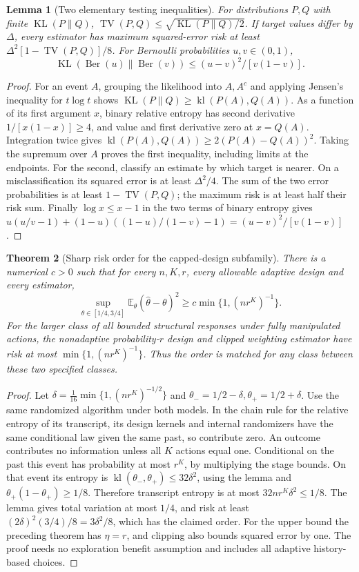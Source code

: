 \documentclass[11pt]{article}
\newtheorem{theorem}{Theorem}
\newtheorem{lemma}[theorem]{Lemma}
\theoremstyle{remark}
\newcommand{\E}{\mathbb E}
\newcommand{\TV}{\operatorname{TV}}
\newcommand{\KL}{\operatorname{KL}}
\begin{document}
\begin{lemma}[Two elementary testing inequalities]
For distributions $P,Q$ with finite $\KL(P\|Q)$,
$\TV(P,Q)\leq\sqrt{\KL(P\|Q)/2}$. If target values differ by
$\Delta$, every estimator has maximum squared-error risk at least
$\Delta^2[1-\TV(P,Q)]/8$.
For Bernoulli probabilities $u,v\in(0,1)$,
\[
 \KL(\operatorname{Ber}(u)\|\operatorname{Ber}(v))
 \leq (u-v)^2/[v(1-v)].
\]
\end{lemma}
\begin{proof}
For an event $A$, grouping the likelihood into $A,A^c$ and applying
Jensen's inequality for $t\log t$ shows
$\KL(P\|Q)\geq\operatorname{kl}(P(A),Q(A))$.
As a function of its first argument $x$, binary relative entropy has
second derivative $1/[x(1-x)]\geq4$, and value and first derivative zero
at $x=Q(A)$. Integration twice gives
$\operatorname{kl}(P(A),Q(A))\geq2(P(A)-Q(A))^2$.
Taking the supremum over $A$ proves the first inequality, including limits
at the endpoints. For the second, classify an estimate by which target
is nearer. On a misclassification its squared error is at least
$\Delta^2/4$. The sum of the two error probabilities is at least
$1-\TV(P,Q)$; the maximum risk is at least half their risk sum.
Finally $\log x\leq x-1$ in the two terms of binary entropy gives
$u(u/v-1)+(1-u)((1-u)/(1-v)-1)=(u-v)^2/[v(1-v)]$.
\end{proof}

\begin{theorem}[Sharp risk order for the capped-design subfamily]
There is a numerical $c>0$ such that for every $n,K,r$, every allowable
adaptive design and every estimator,
\[
 \sup_{\theta\in[1/4,3/4]}\E_\theta(\widehat\theta-\theta)^2
 \geq c\min\{1,(nr^K)^{-1}\}.
\]
For the larger class of all bounded structural responses under fully
manipulated actions, the nonadaptive probability-$r$ design and clipped
weighting estimator have risk at most
$\min\{1,(nr^K)^{-1}\}$. Thus the order is matched for any class between
these two specified classes.
\end{theorem}
\begin{proof}
Let $\delta=\frac1{16}\min\{1,(nr^K)^{-1/2}\}$ and
$\theta_-=1/2-\delta,\theta_+=1/2+\delta$.
Use the same randomized algorithm under both models. In the chain rule
for the relative entropy of its transcript, its design kernels and
internal randomizers have the same conditional law given the same past,
so contribute zero. An outcome contributes no information unless all
$K$ actions equal one. Conditional on the past this event has probability
at most $r^K$, by multiplying the stage bounds. On that event its entropy
is $\operatorname{kl}(\theta_-,\theta_+)\leq32\delta^2$, using the
lemma and $\theta_+(1-\theta_+)\geq1/8$.
Therefore transcript entropy is at most $32nr^K\delta^2\leq1/8$.
The lemma gives total variation at most $1/4$, and risk at least
$(2\delta)^2(3/4)/8=3\delta^2/8$, which has the claimed order.
For the upper bound the preceding theorem has $\eta=r$, and clipping
also bounds squared error by one. The proof needs no exploration benefit
assumption and includes all adaptive history-based choices.
\end{proof}
\end{document}
